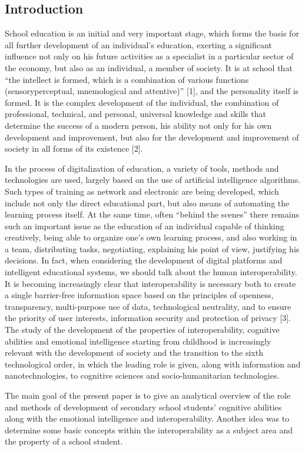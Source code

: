 \documentclass{article}
\begin{document}
\begin{multicols}{2}
\section{Introduction}
\vspace{-0.5em}
\hspace{1em}School education is an initial and very important stage,
which forms the basis for all further development of an individual’s education, exerting a significant influence not
only on his future activities as a specialist in a particular
sector of the economy, but also as an individual, a member of society. It is at school that “the intellect is formed,
which is a combination of various functions (sensoryperceptual, mnemological and attentive)” [1], and the
personality itself is formed. It is the complex development of the individual, the combination of professional,
technical, and personal, universal knowledge and skills
that determine the success of a modern person, his ability
not only for his own development and improvement, but
also for the development and improvement of society in
all forms of its existence [2].
\par In the process of digitalization of education, a variety
of tools, methods and technologies are used, largely
based on the use of artificial intelligence algorithms.
Such types of training as network and electronic are
being developed, which include not only the direct educational part, but also means of automating the learning
process itself. At the same time, often “behind the scenes”
there remains such an important issue as the education of
an individual capable of thinking creatively, being able
to organize one’s own learning process, and also working
in a team, distributing tasks, negotiating, explaining his
point of view, justifying his decisions. In fact, when
considering the development of digital platforms and
intelligent educational systems, we should talk about the
human interoperability. It is becoming increasingly clear
that interoperability is necessary both to create a single
barrier-free information space based
on the principles
of openness, transparency, multi-purpose use of data,
technological neutrality, and to ensure the priority of user
interests, information security and protection of privacy
[3]. The study of the development of the properties of
interoperability, cognitive abilities and emotional intelligence starting from childhood is increasingly relevant
with the development of society and the transition to the
sixth technological order, in which the leading role is
given, along with information and nanotechnologies, to
cognitive sciences and socio-humanitarian technologies.
\par The main goal of the present paper is to give an analytical overview of the role and methods of development of
secondary school students’ cognitive abilities along with
the emotional intelligence and interoperability. Another
idea was to determine some basic concepts within the
interoperability as a subject area and the property of a
school student.

\end{multicols}
\end{document}

